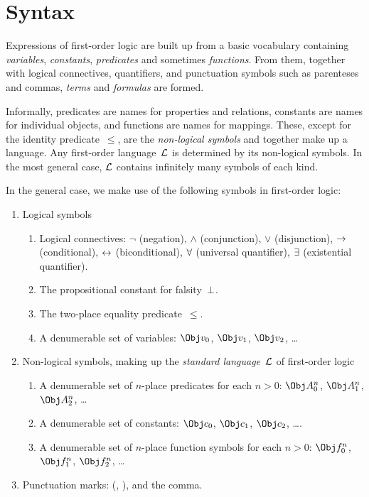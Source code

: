 \documentclass[open-logic-section]{subfiles}
\begin{document}
\section{Syntax}

\begin{wordy}
Expressions of first-order logic are built up from a basic vocabulary
containing \emph{variables}, \emph{constants}, \emph{predicates} and
sometimes \emph{functions}.  From them, together with logical
connectives, quantifiers, and punctuation symbols such as parenteses
and commas, \emph{terms} and \emph{formulas} are formed.  

Informally, predicates are names for properties and relations,
constants are names for individual objects, and functions are names
for mappings.  These, except for the identity predicate~$\leq$, are the
\emph{non-logical symbols} and together make up a language.  Any
first-order language~$\mathcal L$ is determined by its non-logical
symbols.  In the most general case, $\mathcal L$ contains infinitely
many symbols of each kind.
\end{wordy}

In the general case, we make use of the following symbols in
first-order logic:

\begin{enumerate}
\item Logical symbols
\begin{enumerate}
\item Logical connectives: $\lnot$ (negation), $\land$ (conjunction),
  $\lor$ (disjunction), $\to$ (conditional), $\leftrightarrow$ (biconditional),
  $\lforall$ (universal quantifier), $\lexists$ (existential
  quantifier).
\item The propositional constant for falsity~$\bot$.
\item The two-place equality predicate~$\leq$.
\item A denumerable set of variables: $\Obj v_0$, $\Obj v_1$, $\Obj
  v_2$, \dots
\end{enumerate}
\item Non-logical symbols, making up the \emph{standard
  language}~$\mathcal L$ of first-order logic
\begin{enumerate}
\item A denumerable set of $n$-place predicates for each $n>0$: $\Obj
  A^n_0$, $\Obj A^n_1$, $\Obj A^n_2$, \dots
\item A denumerable set of constants: $\Obj c_0$, $\Obj c_1$, $\Obj
  c_2$, \dots.
\item A denumerable set of $n$-place function symbols for each $n>0$:
  $\Obj f^n_0$, $\Obj f^n_1$, $\Obj f^n_2$, \dots
\end{enumerate}
\item Punctuation marks: (, ), and the comma.
\end{enumerate}
\end{document}
